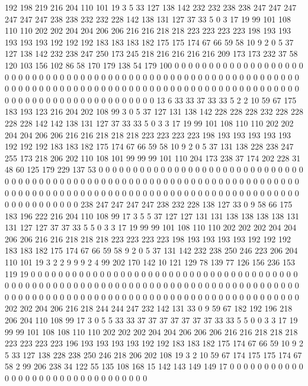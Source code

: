 192 198 219 216 204 110 101 19 3 5 33 127 138 142 232 232 238 238 247 247
247 247 247 247 238 238 232 232 228 142 138 131 127 37 33 5 0 3 17 19
99 101 108 110 110 202 202 204 204 206 206 216 216 218 218 223 223 223 223 198
193 193 193 193 193 192 192 192 183 183 183 182 175 175 174 67 66 59 58 10
9 2 0 5 37 127 138 142 232 238 247 250 173 245 218 216 216 216 216 209
173 173 232 37 58 120 103 156 102 86 58 170 179 138 54 179 100 0 0 0
0 0 0 0 0 0 0 0 0 0 0 0 0 0 0 0 0 0 0 0
0 0 0 0 0 0 0 0 0 0 0 0 0 0 0 0 0 0 0 0
0 0 0 0 0 0 0 0 0 0 0 0 0 0 0 0 0 0 0 0
0 0 0 0 0 0 0 0 0 0 0 0 0 0 0 0 0 0 0 0
0 0 0 0 0 0 0 0 0 0 0 0 0 0 0 0 0 0 0 0
0 0 0 0 0 0 0 0 0 0 0 0 0 0 0 0 0 0 0 0
0 0 0 0 13 6 33 33 37 33 33 5 2 2 10 59 67 175 183 193
123 216 204 202 108 99 3 0 5 37 127 131 138 142 228 228 228 232 228 228
228 228 142 142 138 131 127 37 33 33 5 0 3 3 17 19 99 101 108 110
110 202 202 204 204 206 206 216 216 218 218 218 223 223 223 223 198 193 193 193
193 193 192 192 192 183 183 182 175 174 67 66 59 58 10 9 2 0 5 37
131 138 228 238 247 255 173 218 206 202 110 108 101 99 99 99 101 110 204 173
238 37 174 202 228 31 48 60 125 179 229 137 53 0 0 0 0 0 0 0
0 0 0 0 0 0 0 0 0 0 0 0 0 0 0 0 0 0 0 0
0 0 0 0 0 0 0 0 0 0 0 0 0 0 0 0 0 0 0 0
0 0 0 0 0 0 0 0 0 0 0 0 0 0 0 0 0 0 0 0
0 0 0 0 0 0 0 0 0 0 0 0 0 0 0 0 0 0 0 0
0 0 0 0 0 0 0 0 0 0 0 0 0 0 0 0 0 0 0 0
0 0 0 0 0 0 0 0 0 0 0 0 0 0 0 0 0 0 0 0
238 247 247 247 247 238 232 228 138 127 33 0 9 58 66 175 183 196 222 216
204 110 108 99 17 3 5 5 37 127 127 131 131 138 138 138 138 131 131 127
127 37 37 33 5 5 0 3 3 17 19 99 99 101 108 110 110 202 202 202
204 204 206 206 216 216 218 218 218 223 223 223 223 198 193 193 193 193 192 192
192 183 183 182 175 174 67 66 59 58 9 2 0 5 37 131 142 232 238 250
246 223 206 204 110 101 19 3 2 2 9 9 9 2 4 99 202 170 142 10
121 129 78 139 77 126 156 236 153 119 19 0 0 0 0 0 0 0 0 0
0 0 0 0 0 0 0 0 0 0 0 0 0 0 0 0 0 0 0 0
0 0 0 0 0 0 0 0 0 0 0 0 0 0 0 0 0 0 0 0
0 0 0 0 0 0 0 0 0 0 0 0 0 0 0 0 0 0 0 0
0 0 0 0 0 0 0 0 0 0 0 0 0 0 0 0 0 0 0 0
0 0 0 0 0 0 0 0 0 0 0 0 0 0 0 0 0 0 0 0
0 0 0 0 0 0 0 0 0 0 0 0 0 0 0 0 202 202 204 206
216 218 244 244 247 232 142 131 33 0 9 59 67 182 192 196 218 206 204 110
108 99 17 3 0 5 5 33 33 37 37 37 37 37 37 37 33 33 5 5
0 0 3 3 17 19 99 99 101 108 108 110 110 202 202 202 204 204 206 206
206 216 216 218 218 218 223 223 223 223 196 193 193 193 193 192 192 183 183 182
175 174 67 66 59 10 9 2 5 33 127 138 228 238 250 246 218 206 202 108
19 3 2 10 59 67 174 175 175 174 67 58 2 99 206 238 34 122 55 135
108 168 15 142 143 149 149 17 0 0 0 0 0 0 0 0 0 0 0 0
0 0 0 0 0 0 0 0 0 0 0 0 0 0 0 0 0 0 0 0
